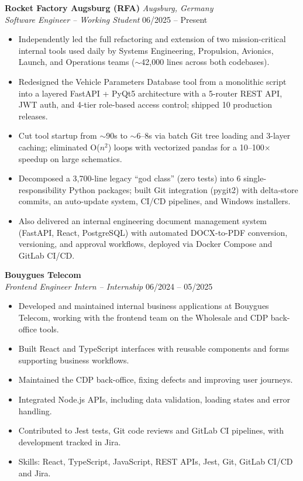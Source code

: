 \documentclass[a4paper,10pt]{article}
\newcommand{\role}[4]{%
\textbf{#1} \hfill \textit{#2}\\%
\textit{#3} \hfill #4%
\vspace{1pt}%
}
\newenvironment{bullets}{%
\begin{itemize}[leftmargin=12pt, itemsep=1pt, topsep=2pt, parsep=0pt, label={--}]%
}{%
\end{itemize}%
}
\begin{document}
\role{Rocket Factory Augsburg (RFA)}{Augsburg, Germany}{Software Engineer -- Working Student}{06/2025 -- Present}
\begin{bullets}
\item Independently led the full refactoring and extension of two mission-critical internal tools used daily by Systems Engineering, Propulsion, Avionics, Launch, and Operations teams ($\sim$42,000 lines across both codebases).
\item Redesigned the Vehicle Parameters Database tool from a monolithic script into a layered FastAPI + PyQt5 architecture with a 5-router REST API, JWT auth, and 4-tier role-based access control; shipped 10 production releases.
\item Cut tool startup from $\sim$90s to $\sim$6--8s via batch Git tree loading and 3-layer caching; eliminated O($n^2$) loops with vectorized pandas for a 10--100$\times$ speedup on large schematics.
\item Decomposed a 3,700-line legacy ``god class'' (zero tests) into 6 single-responsibility Python packages; built Git integration (pygit2) with delta-store commits, an auto-update system, CI/CD pipelines, and Windows installers.
\item Also delivered an internal engineering document management system (FastAPI, React, PostgreSQL) with automated DOCX-to-PDF conversion, versioning, and approval workflows, deployed via Docker Compose and GitLab CI/CD.
\end{bullets}

\begingroup
\fontsize{9}{10}\selectfont
\role{Bouygues Telecom}{}{Frontend Engineer Intern -- Internship}{06/2024 -- 05/2025}
\begin{bullets}
\setlength{\itemsep}{0pt}
\item Developed and maintained internal business applications at Bouygues Telecom, working with the frontend team on the Wholesale and CDP back-office tools.
\item Built React and TypeScript interfaces with reusable components and forms supporting business workflows.
\item Maintained the CDP back-office, fixing defects and improving user journeys.
\item Integrated Node.js APIs, including data validation, loading states and error handling.
\item Contributed to Jest tests, Git code reviews and GitLab CI pipelines, with development tracked in Jira.
\item Skills: React, TypeScript, JavaScript, REST APIs, Jest, Git, GitLab CI/CD and Jira.
\end{bullets}
\endgroup
\end{document}
